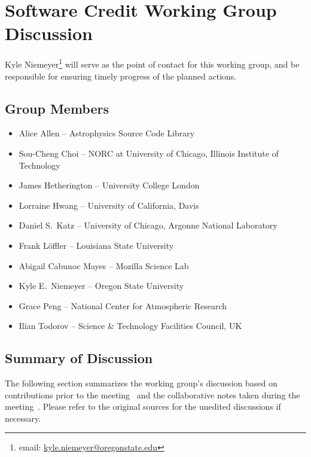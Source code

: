 \section{Software Credit Working Group Discussion}
\label{sec:appendix_SW_credit}

Kyle Niemeyer\footnote{email:
\href{mailto:kyle.niemeyer@oregonstate.edu}{kyle.niemeyer@oregonstate.edu}} will
serve as the point of contact for this working group, and be responsible for
ensuring timely progress of the planned actions.

\subsection{Group Members}

\begin{itemize}
\item Alice Allen -- Astrophysics Source Code Library
\item Sou-Cheng Choi -- NORC at University of Chicago, Illinois Institute of Technology
\item James Hetherington -- University College London
\item Lorraine Hwang -- University of California, Davis
\item Daniel S.\ Katz -- University of Chicago, Argonne National Laboratory
\item Frank L\"{o}ffler -- Louisiana State University
\item Abigail Cabunoc Mayes -- Mozilla Science Lab
\item Kyle E.\ Niemeyer -- Oregon State University
\item Grace Peng -- National Center for Atmospheric Research
\item Ilian Todorov -- Science \& Technology Facilities Council, UK
\end{itemize}


\subsection{Summary of Discussion}

The following section summarizes the working group's discussion based on
contributions prior to the meeting~\cite{WSSSPE3-SC-github-issues} and the
collaborative notes taken during the meeting~\cite{WSSSPE3-SC-google-notes}.
Please refer to the original sources for the unedited discussions if necessary.


